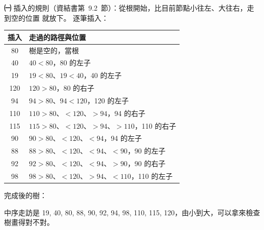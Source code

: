 \begin{pastsoln}
\textbf{㈠} 插入的規則（資結書第~9.2~節）：從根開始，比目前節點小往左、大往右，走到空的位置
就放下。 逐筆插入：
\begin{center}
\small
\begin{tabular}{cl}
\toprule
插入 & 走過的路徑與位置 \\
\midrule
80 & 樹是空的，當根 \\
40 & $40 < 80$，80 的左子 \\
19 & $19 < 80$、$19 < 40$，40 的左子 \\
120 & $120 > 80$，80 的右子 \\
94 & $94 > 80$、$94 < 120$，120 的左子 \\
110 & $110 > 80$、$< 120$、$> 94$，94 的右子 \\
115 & $115 > 80$、$< 120$、$> 94$、$> 110$，110 的右子 \\
90 & $90 > 80$、$< 120$、$< 94$，94 的左子 \\
88 & $88 > 80$、$< 120$、$< 94$、$< 90$，90 的左子 \\
92 & $92 > 80$、$< 120$、$< 94$、$> 90$，90 的右子 \\
98 & $98 > 80$、$< 120$、$> 94$、$< 110$，110 的左子 \\
\bottomrule
\end{tabular}
\end{center}
完成後的樹：
\begin{center}
\end{center}
中序走訪是 19, 40, 80, 88, 90, 92, 94, 98, 110, 115, 120，由小到大，可以拿來檢查樹畫得對不對。


\end{pastsoln}
